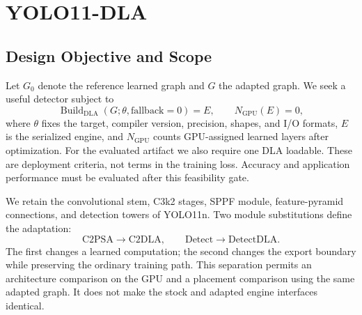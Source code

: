 \section{YOLO11-DLA}
\label{sec:method}

\subsection{Design Objective and Scope}
Let $G_0$ denote the reference learned graph and $G$ the adapted graph. We
seek a useful detector subject to
\begin{equation}
 \operatorname{Build}_{\mathrm{DLA}}(G;\theta,\mathrm{fallback}=0)
 = E, \qquad N_{\mathrm{GPU}}(E)=0,
 \label{eq:accept}
\end{equation}
where $\theta$ fixes the target, compiler version, precision, shapes, and
I/O formats, $E$ is the serialized engine, and $N_{\mathrm{GPU}}$ counts
GPU-assigned learned layers after optimization. For the evaluated artifact we
also require one DLA loadable. These are deployment criteria, not terms in the
training loss. Accuracy and application performance must be evaluated after
this feasibility gate.

We retain the convolutional stem, C3k2 stages, SPPF module, feature-pyramid
connections, and detection towers of YOLO11n. Two module substitutions define
the adaptation:
\begin{equation}
 \mathrm{C2PSA}\longrightarrow\mathrm{C2DLA},\qquad
 \mathrm{Detect}\longrightarrow\mathrm{DetectDLA}.
 \label{eq:substitutions}
\end{equation}
The first changes a learned computation; the second changes the export
boundary while preserving the ordinary training path. This separation permits
an architecture comparison on the GPU and a placement comparison using the
same adapted graph. It does not make the stock and adapted engine interfaces
identical.

